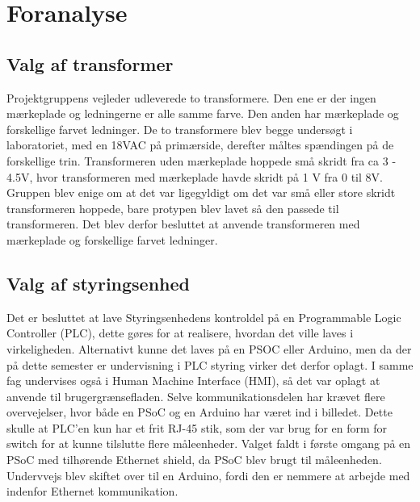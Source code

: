 
\chapter{Foranalyse}

\section{Valg af transformer}
Projektgruppens vejleder udleverede to transformere. Den ene er der ingen mærkeplade og ledningerne er alle samme farve. Den anden har mærkeplade og forskellige farvet ledninger. De to transformere blev begge undersøgt i laboratoriet, med en 18VAC på primærside, derefter måltes spændingen på de forskellige trin. Transformeren uden mærkeplade hoppede små skridt fra ca 3 - 4.5V, hvor transformeren med mærkeplade havde skridt på 1 V fra 0 til 8V. Gruppen blev enige om at det var ligegyldigt om det var små eller store skridt transformeren hoppede, bare protypen blev lavet så den passede til transformeren. Det blev derfor besluttet at anvende transformeren med mærkeplade og forskellige farvet ledninger. 

\section{Valg af styringsenhed}
Det er besluttet at lave Styringsenhedens kontroldel på en Programmable Logic Controller (PLC), dette gøres for at realisere, hvordan det ville laves i virkeligheden. Alternativt kunne det laves på en PSOC eller Arduino, men da der på dette semester er undervisning i PLC styring virker det derfor oplagt. I samme fag undervises også i Human Machine Interface (HMI), så det var oplagt at anvende til brugergrænsefladen. Selve kommunikationsdelen har krævet flere overvejelser, hvor både en PSoC og en Arduino har været ind i billedet. Dette skulle at PLC'en kun har et frit RJ-45 stik, som der var brug for en form for switch for at kunne tilslutte flere måleenheder. Valget faldt i første omgang på en PSoC med tilhørende Ethernet shield, da PSoC blev brugt til måleenheden. Undervvejs blev skiftet over til en Arduino, fordi den er nemmere at arbejde med indenfor Ethernet kommunikation.

